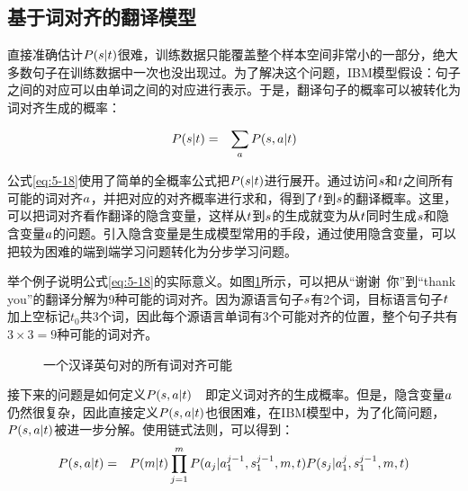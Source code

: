 
\subsection{基于词对齐的翻译模型}

\parinterval 直接准确估计${P}({s}|{t})$很难，训练数据只能覆盖整个样本空间非常小的一部分，绝大多数句子在训练数据中一次也没出现过。为了解决这个问题，IBM模型假设：句子之间的对应可以由单词之间的对应进行表示。于是，翻译句子的概率可以被转化为词对齐生成的概率：

\begin{eqnarray}
{P}({s}|{t})&=& \sum_{{a}}{P}({s},{a}|{t})
\label{eq:5-18}
\end{eqnarray}

\parinterval 公式\eqref{eq:5-18}使用了简单的全概率公式把${P}({s}|{t})$进行展开。通过访问${s}$和${t}$之间所有可能的词对齐${a}$，并把对应的对齐概率进行求和，得到了${t}$到${s}$的翻译概率。这里，可以把词对齐看作翻译的隐含变量，这样从${t}$到${s}$的生成就变为从${t}$同时生成${s}$和隐含变量${a}$的问题。引入隐含变量是生成模型常用的手段，通过使用隐含变量，可以把较为困难的端到端学习问题转化为分步学习问题。

\parinterval 举个例子说明公式\eqref{eq:5-18}的实际意义。如图\ref{fig:5-17}所示，可以把从“谢谢\ 你”到“thank you”的翻译分解为9种可能的词对齐。因为源语言句子${s}$有2个词，目标语言句子${t}$加上空标记$t_0$共3个词，因此每个源语言单词有3个可能对齐的位置，整个句子共有$3\times3=9$种可能的词对齐。

\begin{figure}[htp]
    \centering

    \caption{一个汉译英句对的所有词对齐可能}
    \label{fig:5-17}
\end{figure}

\parinterval 接下来的问题是如何定义${P}({s},{a}|{t})$\ \dash \ 即定义词对齐的生成概率。但是，隐含变量${a}$仍然很复杂，因此直接定义${P}({s},{a}|{t})$也很困难，在IBM模型中，为了化简问题，${P}({s},{a}|{t})$被进一步分解。使用链式法则，可以得到：
\begin{eqnarray}
{P}({s},{a}|{t})&=&{P}(m|{t})\prod_{j=1}^{m}{{P}(a_j|{a}{}_1^{j-1},{s}{}_1^{j-1},m,{t}){P}(s_j|{a}{}_1^{j},{s}{}_1^{j-1},m,{t})}
\label{eq:5-19}
\end{eqnarray}

